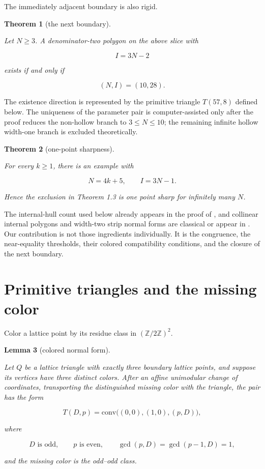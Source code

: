 \documentclass[11pt]{article}
\newtheorem{theorem}{Theorem}[section]
\newtheorem{lemma}[theorem]{Lemma}
\theoremstyle{remark}
\numberwithin{equation}{section}
\begin{document}
The immediately adjacent boundary is also rigid.

\begin{theorem}[the next boundary]\label{thm:next-boundary}

Let $N\ge3$. A denominator-two polygon on the above slice with

\[
I=3N-2
\]

exists if and only if

\[
(N,I)=(10,28).
\]

\end{theorem}

The existence direction is represented by the primitive triangle $T(57,8)$ defined below. The uniqueness of the parameter pair is computer-assisted only after the proof reduces the non-hollow branch to $3\le N\le10$; the remaining infinite hollow width-one branch is excluded theoretically.

\begin{theorem}[one-point sharpness]\label{thm:sharpness}

For every $k\ge1$, there is an example with

\[
N=4k+5,\qquad I=3N-1.
\]

Hence the exclusion in Theorem 1.3 is one point sharp for infinitely many $N$.

\end{theorem}

The internal-hull count used below already appears in the proof of \cite[Proposition~6.8]{ref2}, and collinear internal polygons and width-two strip normal forms are classical or appear in \cite{ref4,ref7,ref8}. Our contribution is not those ingredients individually. It is the congruence, the near-equality thresholds, their colored compatibility conditions, and the closure of the next boundary.

\section{Primitive triangles and the missing color}


Color a lattice point by its residue class in $(\mathbb Z/2\mathbb Z)^2$.

\begin{lemma}[colored normal form]\label{lem:normal-form}

Let $Q$ be a lattice triangle with exactly three boundary lattice points, and suppose its vertices have three distinct colors. After an affine unimodular change of coordinates, transporting the distinguished missing color with the triangle, the pair has the form

\[
T(D,p)=\mathrm{conv}\bigl((0,0),(1,0),(p,D)\bigr),
\]

where

\[
D\text{ is odd},\qquad p\text{ is even},\qquad
\gcd(p,D)=\gcd(p-1,D)=1,
\]

and the missing color is the odd--odd class.

\end{lemma}
\end{document}
